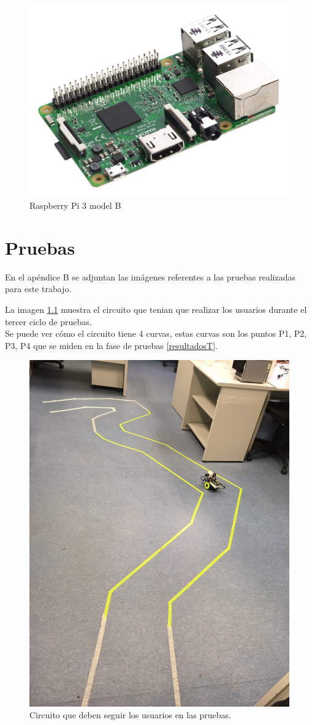 \documentclass[twoside, 11pt]{epstfg}
\begin{document}
\begin{figure}[H]
	\centerline{
		\mbox{\includegraphics[width=.80\textwidth]{images/raspi3.jpg}}
	}
	\caption{Raspberry Pi 3 model B}
	\label{Raspberry}
	
\end{figure}

\chapter{Pruebas}
\vspace*{-4cm}

En el apéndice B se adjuntan las imágenes referentes a las pruebas realizadas para este trabajo.

La imagen \ref{Circuito} muestra el circuito que tenian que realizar los usuarios durante el tercer ciclo de pruebas.\\
Se puede ver cómo el circuito tiene 4 curvas, estas curvas son los puntos P1, P2, P3, P4 que se miden en la fase de pruebas \ref{resultadosT}. 


\begin{figure}[H]
	\centerline{
		\mbox{\includegraphics[width=.50\textwidth]{images/circuitobueno.jpg}}
	}
	\caption{Circuito que deben seguir los usuarios en las pruebas.}
	\label{Circuito}
\end{figure}
\end{document}
